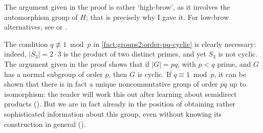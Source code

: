 The argument given in the proof is rather `high-brow', as it involves
the automorphism group of $H$; that is precisely why I gave it. For
low-brow alternatives, see
 or
.

The condition $q \not\equiv 1 \bmod p$ in
\cref{fact:groups2:order-pq-cyclic} is clearly necessary: indeed,
$|S_3| = 2 \cdot 3$ is the product of two distinct primes, and yet
$S_3$ is not cyclic. The argument given in the proof shows that if
$|G| = pq$, with $p < q$ prime, and $G$ has a normal subgroup of order
$p$, then $G$ is cyclic. If $q \equiv 1 \bmod p$, it can be shown that
there is in fact a unique noncommutative group of order $pq$ up to
isomorphism: the reader will work this out after learning about
semidirect products (). But we
are in fact already in the position of obtaining rather sophisticated
information about this group, even without knowing its construction in
general ().

